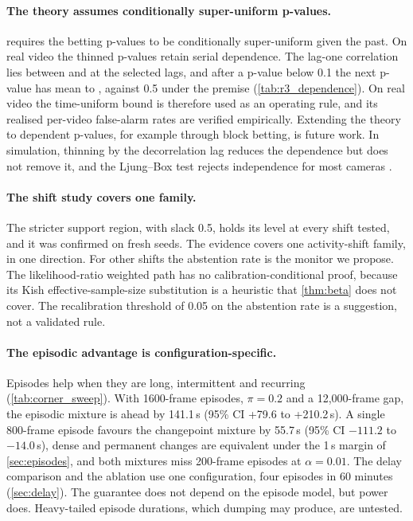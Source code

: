 \paragraph{The theory assumes conditionally super-uniform p-values.}
 requires the betting p-values to be conditionally super-uniform given the past. On real video the thinned p-values retain serial dependence. The lag-one correlation lies between \RThreeDepCorrMin{} and \RThreeDepCorrMax{} at the selected lags, and after a p-value below 0.1 the next p-value has mean \RThreeDepCondMin{} to \RThreeDepCondMax{}, against 0.5 under the premise (\cref{tab:r3_dependence}). On real video the time-uniform bound is therefore used as an operating rule, and its realised per-video false-alarm rates are verified empirically. Extending the theory to dependent p-values, for example through block betting, is future work. In simulation, thinning by the decorrelation lag reduces the dependence but does not remove it, and the Ljung--Box test rejects independence for most cameras \citep{ljung1978}.

\paragraph{The shift study covers one family.}
The stricter support region, with slack 0.5, holds its level at every shift tested, and it was confirmed on fresh seeds. The evidence covers one activity-shift family, in one direction. For other shifts the abstention rate is the monitor we propose. The likelihood-ratio weighted path has no calibration-conditional proof, because its Kish effective-sample-size substitution is a heuristic that \cref{thm:beta} does not cover. The recalibration threshold of 0.05 on the abstention rate is a suggestion, not a validated rule.

\paragraph{The episodic advantage is configuration-specific.}
Episodes help when they are long, intermittent and recurring (\cref{tab:corner_sweep}). With 1600-frame episodes, $\pi=0.2$ and a 12{,}000-frame gap, the episodic mixture is ahead by 141.1\,s (95\% CI +79.6 to +210.2\,s). A single 800-frame episode favours the changepoint mixture by 55.7\,s (95\% CI $-111.2$ to $-14.0$\,s), dense and permanent changes are equivalent under the 1\,s margin of \cref{sec:episodes}, and both mixtures miss 200-frame episodes at $\alpha=0.01$. The delay comparison and the ablation use one configuration, four episodes in 60 minutes (\cref{sec:delay}). The guarantee does not depend on the episode model, but power does. Heavy-tailed episode durations, which dumping may produce, are untested.


